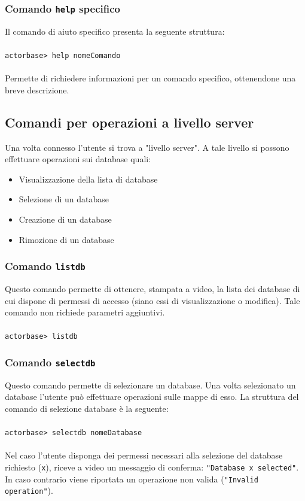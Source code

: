 \documentclass[a4paper]{article}
\begin{document}
	\subsubsection{Comando \texttt{help} specifico}
	Il comando di aiuto specifico presenta la seguente struttura:
	\\ \\
	\texttt{actorbase>	help nomeComando}
	\\ \\
	Permette di richiedere informazioni per un comando specifico, ottenendone una breve descrizione.
	
	\subsection{Comandi per operazioni a livello server}
	Una volta connesso l'utente si trova a "livello server". A tale livello si possono effettuare operazioni sui database quali:
	\begin{itemize}
		\item Visualizzazione della lista di database
		\item Selezione di un database
		\item Creazione di un database
		\item Rimozione di un database
	\end{itemize}
	
	\subsubsection{Comando \texttt{listdb}}
	Questo comando permette di ottenere, stampata a video, la lista dei database di cui dispone di permessi di accesso (siano essi di visualizzazione o modifica). Tale comando non richiede parametri aggiuntivi.
	\\ \\
	\texttt{actorbase>	listdb}

	\subsubsection{Comando \texttt{selectdb}}
	Questo comando permette di selezionare un database. Una volta selezionato un database l'utente può effettuare operazioni sulle mappe di esso. La struttura del comando di selezione database è la seguente:
	\\ \\
	\texttt{actorbase>	selectdb nomeDatabase}
	\\ \\
	Nel caso l'utente disponga dei permessi necessari alla selezione del database richiesto (\texttt{x}), riceve a video un messaggio di conferma: \texttt{"Database x selected"}. In caso contrario viene riportata un operazione non valida (\texttt{"Invalid operation"}).
\end{document}
